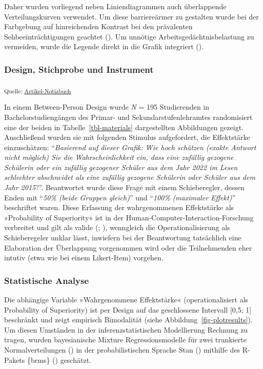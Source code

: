 \documentclass[
  jou,
  floatsintext,
  longtable,
  nolmodern,
  notxfonts,
  notimes,
  colorlinks=true,linkcolor=blue,citecolor=blue,urlcolor=blue]{apa7}
\begin{document}
Daher wurden vorliegend neben Liniendiagrammen auch überlappende
Verteilungskurven verwendet. Um diese barriereärmer zu gestalten wurde
bei der Farbgebung auf hinreichenden Kontrast bei den prävalenten
Sehbeeinträchtigungen geachtet (). Um unnötige Arbeitsgedächtnisbelastung zu vermeiden, wurde
die Legende direkt in die Grafik integriert
().

\subsubsection{Design, Stichprobe und
Instrument}\label{design-stichprobe-und-instrument}

\textsubscript{Quelle:
\href{https://sammerk.github.io/StudienergebnisseBesserKommunizieren/index.qmd.html}{Artikel-Notizbuch}}

In einem Between-Person Design wurde \emph{N} = 195 Studierenden in
Bachelorstudiengängen des Primar- und Sekundarstufenlehramtes
randomisiert eine der beiden in Tabelle~\ref{tbl-materials}
dargestellten Abbildungen gezeigt. Anschließend wurden sie mit folgenden
Stimulus aufgefordert, die Effektstärke einzuschätzen: ``\emph{Basierend
auf dieser Grafik: Wie hoch schätzen (exakte Antwort nicht möglich) Sie
die Wahrscheinlichkeit ein, dass eine zufällig gezogene Schülerin oder
ein zufällig gezogener Schüler aus dem Jahr 2022 im Lesen schlechter
abschneidet als eine zufällig gezogene Schülerin oder Schüler aus dem
Jahr 2015}?''. Beantwortet wurde diese Frage mit einem Schieberegler,
dessen Enden mit ``\emph{50\% (beide Gruppen gleich)}'' und
``\emph{100\%} \emph{(maximaler Effekt)}'' beschriftet waren. Diese
Erfassung der wahrgenommenen Effektstärke als »Probability of
Superiority« ist in der Human-Computer-Interaction-Forschung verbreitet
und gilt als valide (;
), wenngleich die
Operationalisierung als Schieberegeler unklar lässt, inwiefern bei der
Beantwortung tatsächlich eine Elaboration der Überlappung vorgenommen
wird oder die Teilnehmenden eher intutiv (etwa wie bei einem
Likert-Item) vorgehen.

\subsubsection{Statistische Analyse}\label{statistische-analyse}

Die abhängige Variable »Wahrgenommene Effektstärke« (operationalisiert
als Probability of Superiority) ist per Design auf das geschlossene
Intervall {[}0,5; 1{]} beschränkt und zeigt empirisch Bimodalität (siehe
Abbildung~\ref{fig-plotresults}). Um diesen Umständen in der
inferenzstatistischen Modellierung Rechnung zu tragen, wurden
bayesianische Mixture Regressionsmodelle für zwei trunkierte
Normalverteilungen () in der probabilistischen Sprache Stan
()
mithilfe des R-Pakets \{brms\} () geschätzt.
\end{document}
